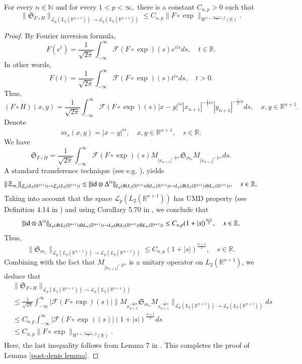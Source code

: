 \documentclass{amsart}
\begin{document}
\begin{lemma}\label{post-denis lemma} For every $n\in\mathbb{N}$ and for every $1<p<\infty,$ there is a constant $C_{n,p}>0$ such that
$$\|\mathfrak{S}_{F\circ H}\|_{\mathcal{L}_p(L_2(\mathbb{R}^{n+1}))\to \mathcal{L}_p(L_2(\mathbb{R}^{n+1}))}\leq C_{n,p}\|F\circ\exp\|_{W^{1+\lceil\frac{n+1}{2}\rceil,2}(\mathbb{R})}.$$
\end{lemma}
\begin{proof} By Fourier inversion formula,
$$F(e^t)=\frac1{\sqrt{2\pi}}\int_{-\infty}^{\infty}\mathcal{F}(F\circ\exp)(s)e^{its}ds,\quad t\in\mathbb{R}.$$
In other words,
$$F(t)=\frac1{\sqrt{2\pi}}\int_{-\infty}^{\infty}\mathcal{F}(F\circ\exp)(s)t^{is}ds,\quad t>0.$$
Thus,
$$(F\circ H)(x,y)=\frac1{\sqrt{2\pi}}\int_{-\infty}^{\infty}\mathcal{F}(F\circ\exp)(s)|x-y|^{is}|x_{n+1}|^{-\frac12is}|y_{n+1}|^{-\frac12is}ds,\quad x,y\in\mathbb{R}^{n+1}.$$
Denote
$$m_s(x,y)=|x-y|^{is},\quad x,y\in\mathbb{R}^{n+1},\quad s\in\mathbb{R}.$$
We have
$$\mathfrak{S}_{F\circ H}=\frac1{\sqrt{2\pi}}\int_{-\infty}^{\infty}\mathcal{F}(F\circ\exp)(s)M_{|x_{n+1}|^{-\frac12is}}\mathfrak{S}_{m_s}M_{|x_{n+1}|^{-\frac12is}}ds.$$
A standard transference technique (see e.g.  \cite{MR3378821,MR2866074}), yields
$$\|\mathfrak{S}_{m_s}\|_{\mathcal{L}_p(L_2(\mathbb{R}^{n+1}))\rightarrow \mathcal{L}_p(L_2(\mathbb{R}^{n+1}))} \leq\|{\rm id}\otimes \Delta^{is}\|_{L_p(B(L_2(\mathbb{R}^{n+1}))\bar{\otimes}L_{\infty}(\mathbb{R}^{n+1}))\rightarrow L_p(B(L_2(\mathbb{R}^{n+1}))\bar{\otimes}L_{\infty}(\mathbb{R}^{n+1}))},\quad s\in\mathbb{R}.$$
Taking into account that the space $\mathcal{L}_p(L_2(\mathbb{R}^{n+1}))$ has UMD property (see Definition 4.14 in \cite{HNVWbook}) and using Corollary 5.70 in \cite{HNVWbook}, we conclude that
$$\|{\rm id}\otimes \Delta^{is}\|_{L_p(B(L_2(\mathbb{R}^{n+1}))\bar{\otimes}L_{\infty}(\mathbb{R}^{n+1}))\rightarrow L_p(B(L_2(\mathbb{R}^{n+1}))\bar{\otimes}L_{\infty}(\mathbb{R}^{n+1}))}\leq C_{n,p}(1+|s|)^{\frac{n+1}{2}},\quad s\in\mathbb{R}.$$
Thus,
$$\|\mathfrak{S}_{m_s}\|_{\mathcal{L}_p(L_2(\mathbb{R}^{n+1}))\rightarrow \mathcal{L}_p(L_2(\mathbb{R}^{n+1}))}\leq C_{n,p}(1+|s|)^{\frac{n+1}{2}},\quad s\in\mathbb{R}.$$
Combining with the fact that $M_{|x_{n+1}|^{-\frac12is}}$ is a unitary operator on $L_2(\mathbb{R}^{n+1})$, we deduce that
\begin{align*}
&\|\mathfrak{S}_{F\circ H}\|_{\mathcal{L}_p(L_2(\mathbb{R}^{n+1}))\to \mathcal{L}_p(L_2(\mathbb{R}^{n+1}))}\\
&\leq\frac1{\sqrt{2\pi}}\int_{-\infty}^{\infty}|\mathcal{F}(F\circ\exp)(s)|\Big\|M_{x_{n+1}^{-\frac12is}}\mathfrak{S}_{m_s}M_{x_{n+1}^{-\frac12is}}\Big\|_{\mathcal{L}_p(L_2(\mathbb{R}^{n+1}))\to \mathcal{L}_p(L_2(\mathbb{R}^{n+1}))}ds\\
&\leq C_{n,p}\int_{-\infty}^{\infty}|\mathcal{F}(F\circ\exp)(s)| (1+|s|)^{\frac{n+1}{2}}ds\\
&\leq C_{n,p}\|F\circ\exp\|_{W^{1+\lceil\frac{n+1}{2}\rceil,2}(\mathbb{R})}.
\end{align*}
Here, the last inequality follows from Lemma 7 in \cite{PS-crelle}. This completes the proof of Lemma \ref{post-denis lemma}.
\end{proof}
\end{document}
